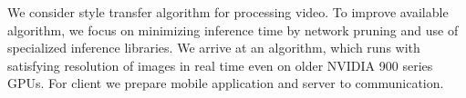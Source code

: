 \documentclass[../Main.tex]{subfiles}
\begin{document}

We consider style transfer algorithm for processing video. 
To improve available algorithm, we focus on minimizing inference time by
network pruning and use of specialized inference libraries. We arrive at an algorithm, 
which runs with satisfying resolution of images in real time even on older
NVIDIA 900 series GPUs. For client we prepare mobile application and server to communication.

\par\vspace*{\fill} %


\biblio %
\end{document}
